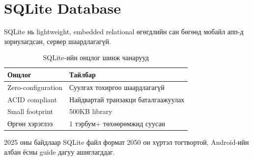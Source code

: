 \section{SQLite Database}

SQLite нь lightweight, embedded relational өгөгдлийн сан бөгөөд мобайл апп-д зориулагдсан, сервер шаардлагагүй.

\begin{table}[h]
\centering
\begin{tabular}{|p{4cm}|p{9cm}|}
\hline
\textbf{Онцлог} & \textbf{Тайлбар} \\
\hline
Zero-configuration & Суулгах тохиргоо шаардлагагүй \\
\hline
ACID compliant & Найдвартай транзакци баталгаажуулах \\
\hline
Small footprint & 500KB library \\
\hline
Өргөн хэрэглээ & 1 тэрбум+ төхөөрөмжид суусан \\
\hline
\end{tabular}
\caption{SQLite-ийн онцлог шинж чанарууд}
\label{tab:sqlite}
\end{table}

2025 оны байдлаар SQLite файл формат 2050 он хүртэл тогтвортой, Android-ийн албан ёсны guide дагуу ашиглагддаг.